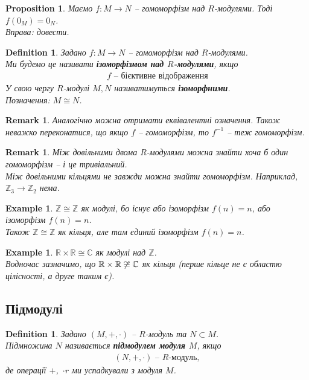 \documentclass[a4paper, 10pt]{article}
\theoremstyle{theoremdd}
\theoremstyle{theoremdd}
\newtheorem{definition}[theorem]{Definition}
\theoremstyle{theoremdd}
\theoremstyle{theoremdd}
\theoremstyle{theoremdd}
\newtheorem{example}[theorem]{Example}
\theoremstyle{theoremdd}
\theoremstyle{theoremdd}
\theoremstyle{theoremdd}
\theoremstyle{theoremdd}
\newtheorem{proposition}[theorem]{Proposition}
\theoremstyle{theoremdd}
\theoremstyle{theoremdd}
\newtheorem{remark}[theorem]{Remark}
\theoremstyle{theoremdd}
\theoremstyle{theoremdd}
\theoremstyle{theoremdd}
\theoremstyle{theoremdd}
\begin{document}
\begin{proposition}
Маємо $f \colon M \to N$ -- гомоморфізм над $R$-модулями. Тоді $f(0_M) = 0_N$.\\
\textit{Вправа: довести.}
\end{proposition}

\begin{definition}
Задано $f \colon M \to N$ -- гомоморфізм над $R$-модулями.\\
Ми будемо це називати \textbf{ізоморфізмом над $R$-модулями}, якщо
\begin{align*}
f \text{ -- бієктивне відображення}
\end{align*}
У свою чергу $R$-модулі $M,N$ називатимуться \textbf{ізоморфними}.\\
Позначення: $M \cong N$.
\end{definition}

\begin{remark}
Аналогічно можна отримати еквівалентні означення. Також неважко переконатися, що якщо $f$ -- гомоморфізм, то $f^{-1}$ -- теж гомоморфізм.
\end{remark}

\begin{remark}
Між довільними двома $R$-модулями можна знайти хоча б один гомоморфізм -- і це тривіальний.\\
Між довільними кільцями не завжди можна знайти гомоморфізм. Наприклад, $\mathbb{Z}_3 \to \mathbb{Z}_2$ нема.
\end{remark}

\begin{example}
$\mathbb{Z} \cong \mathbb{Z}$ як модулі, бо існує або ізоморфізм $f(n) = n$, або ізоморфізм $f(n) = n$. \\
Також $\mathbb{Z} \cong \mathbb{Z}$ як кільця, але там єдиний ізоморфізм $f(n) = n$.
\end{example}

\begin{example}
$\mathbb{R} \times \mathbb{R} \cong \mathbb{C}$ як модулі над $\mathbb{Z}$.\\
Водночас зазначимо, що $\mathbb{R} \times \mathbb{R} \centernot\cong \mathbb{C}$ як кільця (перше кільце не є областю цілісності, а друге таким є).
\end{example}

\subsection{Підмодулі}
\begin{definition}
Задано $(M,+,\cdot)$ -- $R$-модуль та $N \subset M$.\\
Підмножина $N$ називається \textbf{підмодулем модуля $M$}, якщо 
\begin{align*}
(N,+,\cdot) \text{ -- $R$-модуль},
\end{align*}
де операції $+$,\ $\cdot r$ ми успадкували з модуля $M$.
\end{definition}
\end{document}
